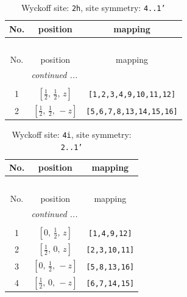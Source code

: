 \documentclass[fleqn,8pt]{jsarticle}
\begin{document}
\begin{longtable}{ccc}
\caption{Wyckoff site: {\tt 2h}, site symmetry: {\tt 4..1'}}
 \\
 \hline \hline
No. & position & mapping \\ \hline \endfirsthead

\multicolumn{2}{l}{\tablename\ \thetable{}} \\
 \hline \hline
No. & position & mapping \\ \hline \endhead

 \hline \hline
\multicolumn{2}{r}{\footnotesize\it continued ...} \\ \endfoot

 \hline \hline
\multicolumn{2}{r}{} \\ \endlastfoot

1 & $\left[ \frac{1}{2},\, \frac{1}{2},\, z \right]$ & {\tt [1,2,3,4,9,10,11,12]} \\ \hline
2 & $\left[ \frac{1}{2},\, \frac{1}{2},\, - z \right]$ & {\tt [5,6,7,8,13,14,15,16]} \\
\end{longtable}
\renewcommand{\arraystretch}{1.2}
\begin{longtable}{ccc}
\caption{Wyckoff site: {\tt 4i}, site symmetry: {\tt 2..1'}}
 \\
 \hline \hline
No. & position & mapping \\ \hline \endfirsthead

\multicolumn{2}{l}{\tablename\ \thetable{}} \\
 \hline \hline
No. & position & mapping \\ \hline \endhead

 \hline \hline
\multicolumn{2}{r}{\footnotesize\it continued ...} \\ \endfoot

 \hline \hline
\multicolumn{2}{r}{} \\ \endlastfoot

1 & $\left[ 0,\, \frac{1}{2},\, z \right]$ & {\tt [1,4,9,12]} \\ \hline
2 & $\left[ \frac{1}{2},\, 0,\, z \right]$ & {\tt [2,3,10,11]} \\ \hline
3 & $\left[ 0,\, \frac{1}{2},\, - z \right]$ & {\tt [5,8,13,16]} \\ \hline
4 & $\left[ \frac{1}{2},\, 0,\, - z \right]$ & {\tt [6,7,14,15]} \\
\end{longtable}
\renewcommand{\arraystretch}{1.2}
\end{document}
